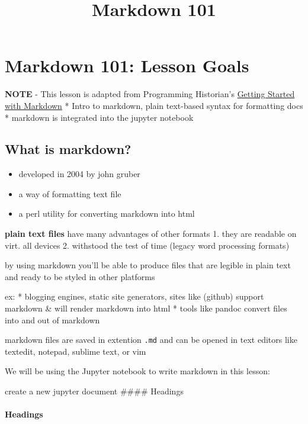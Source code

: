 \documentclass{article}
\title{Markdown 101}
\providecommand{\tightlist}{%
      \setlength{\itemsep}{0pt}\setlength{\parskip}{0pt}}
\begin{document}
    
    
    \maketitle
    
    

    
    \section{Markdown 101: Lesson Goals}\label{markdown-101-lesson-goals}

    \textbf{NOTE} - This lesson is adapted from Programming Historian's
\href{https://github.com/programminghistorian/jekyll/blob/gh-pages/lessons/getting-started-with-markdown.md}{Getting
Started with Markdown} * Intro to markdown, plain text-based syntax for
formatting docs * markdown is integrated into the jupyter notebook

    \subsection{What is markdown?}\label{what-is-markdown}

    \begin{itemize}
\tightlist
\item
  developed in 2004 by john gruber
\item
  a way of formatting text file
\item
  a perl utility for converting markdown into html
\end{itemize}

\textbf{plain text files} have many advantages of other formats 1. they
are readable on virt. all devices 2. withstood the test of time (legacy
word processing formats)

by using markdown you'll be able to produce files that are legible in
plain text and ready to be styled in other platforms

ex: * blogging engines, static site generators, sites like (github)
support markdown \& will render markdown into html * tools like pandoc
convert files into and out of markdown

    markdown files are saved in extention \texttt{.md} and can be opened in
text editors like textedit, notepad, sublime text, or vim

    We will be using the Jupyter notebook to write markdown in this lesson:

    create a new jupyter document
#### Headings
    \paragraph{Headings}\label{headings}
\end{document}
